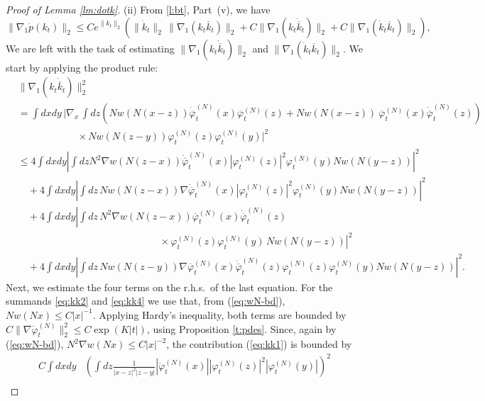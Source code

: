 \documentclass[11pt,a4paper]{article}
\newcommand{\di}{{d}}		%
\newcommand{\cc}[1]{\overline{#1}}	%
\newcommand{\norm}[1]{\lVert#1\rVert}	%
\newcommand{\ph}{\varphi_t^{(N)}}	%
\newcommand{\phdot}{\dot{\varphi}_t^{(N)}}	%
\begin{document}
\begin{proof}[Proof of Lemma \ref{lm:dotk}]
(ii) {F}rom \ref{l:bt}, Part~(v), we have
\[\| \nabla_1 \dot p (k_t) \|_2 \leq C e^{\| k_t \|_2} \left( \| \dot k_t \|_2 \,  \| \nabla_1 (k_t \overline{k}_t) \|_2 + C \| \nabla_1 (k_t \dot{\overline{k}}_t) \|_2  + C \| \nabla_1 (\dot k_t \overline{k}_t) \|_2 \right) , \]
We are left with the task of estimating $\| \nabla_1 (k_t \dot{\overline{k}}_t) \|_2$ and $\| \nabla_1 (\dot k_t \overline{k}_t) \|_2$. We start by applying the product rule:
\begin{align}
& \norm{\nabla_1 (k_t \dot{\overline{k}}_t)}_2^2  \nonumber \\
& = \int \di x \di y \, \bigg\lvert \nabla_x \, \int dz \left( N w(N(x-z)) \dot{\cc{\varphi}}_t^{(N)} (x) \cc{\varphi}_t^{(N)} (z) + N w(N(x-z))\ \cc{\varphi}_t^{(N)} (x) \dot{\cc{\varphi}}_t^{(N)} (z) \right) \nonumber \\
& \qquad\qquad\qquad \times N w(N(z-y)) {\ph(z)} {\ph(y)} \bigg\rvert^2 \nonumber \\
& \leq 4 \int \di x \di y \left\lvert \int dz N^2 \nabla w (N(z-x)) \dot{\cc{\varphi}}_t^{(N)} (x)  |\ph(z)|^2  \ph(y) N w (N(y-z)) \right|^2 \label{eq:kk1} \\
& \quad + 4 \int \di x \di y \left| \int dz \, N w (N(z-x)) \nabla \dot{\cc{\varphi}}_t^{(N)} (x) |\ph(z)|^2 \ph(y) N w (N(y-z)) \right|^2 \label{eq:kk2}\\
& \quad + 4 \int \di x \di y \left| \int dz \, N^2 \nabla w (N(z-x)) \cc{\varphi}_t^{(N)} (x) \dot{\cc{\varphi}}_t^{(N)} (z) \right. \nonumber \\ & \left. \hspace{6cm} \times \ph(z)  \ph(y) \, N w (N(y-z)) \right|^2 \label{eq:kk3}\\
& \quad + 4 \int \di x \di y \left| \int dz \, N w(N(z-y)) \nabla \cc{\varphi}_t^{(N)} (x) \dot{\cc{\varphi}}_t^{(N)} (z) \ph(z) \ph(y) N w(N(y-z)) \right|^2. \label{eq:kk4}
\end{align}
Next, we estimate the four terms on the r.h.s.\ of the last equation. For the summands \eqref{eq:kk2} and \eqref{eq:kk4} we use that, from (\ref{eq:wN-bd}), $N w(Nx) \leq C |x|^{-1}$. Applying Hardy's inequality, both terms are bounded by $C \norm{\nabla \phdot}_{2}^2 \leq C \exp (K |t|)$, using Proposition \ref{t:pdes}. Since, again by (\ref{eq:wN-bd}), $N^2 \nabla w (Nx)\leq C |x|^{-2}$, the contribution (\ref{eq:kk1}) is bounded by 
\begin{align*}
C \int \di x \di y &\left( \int \di z \frac{1}{|x-z|^2 |z-y|} |\dot{\varphi}_t^{(N)} (x)| |\ph(z)|^2 |\ph(y)|  \right)^2 \\

\end{align*}
\end{proof}
\end{document}
